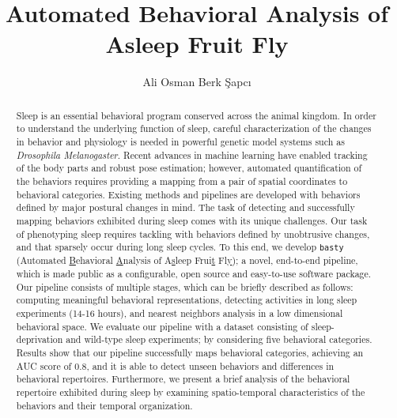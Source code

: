 \documentclass[
  12pt,
  oneside,
  a4paper
  ]{report}
\begin{document}
\title{Automated Behavioral Analysis of Asleep Fruit Fly}
\author{Ali Osman Berk Şapcı}
\maketitle

\tableofcontents
\listoffigures
\listoftables

\begin{abstract}
	Sleep is an essential behavioral program conserved across the animal kingdom.
	In order to understand the underlying function of sleep, careful characterization of the changes in behavior and physiology is needed in powerful genetic model systems such as \textit{Drosophila Melanogaster}.
	Recent advances in machine learning have enabled tracking of the body parts and robust pose estimation; however, automated quantification of the behaviors requires providing a mapping from a pair of spatial coordinates to behavioral categories.
	Existing methods and pipelines are developed with behaviors defined by major postural changes in mind.
	The task of  detecting and successfully mapping behaviors exhibited during sleep comes with its unique challenges.
	Our task of phenotyping sleep requires tackling with behaviors defined by unobtrusive changes, and that sparsely occur during long sleep cycles.
	To this end, we develop \texttt{basty} (Automated \underline{B}ehavioral \underline{A}nalysis of A\underline{s}leep Frui\underline{t} Fl\underline{y}); a novel, end-to-end pipeline, which is made public as a configurable, open source and easy-to-use software package.
	Our pipeline consists of multiple stages, which can be briefly described as follows: computing meaningful behavioral representations, detecting activities in long sleep experiments (14-16 hours), and nearest neighbors analysis in a low dimensional behavioral space.
	We evaluate our pipeline with a dataset consisting of sleep-deprivation and wild-type sleep experiments; by considering five behavioral categories.
	Results show that our pipeline successfully maps behavioral categories, achieving an AUC score of 0.8, and it is able to detect unseen behaviors and differences in behavioral repertoires.
	Furthermore, we present a brief analysis of the behavioral repertoire exhibited during sleep by examining spatio-temporal characteristics of the behaviors and their temporal organization.
\end{abstract}











\end{document}
